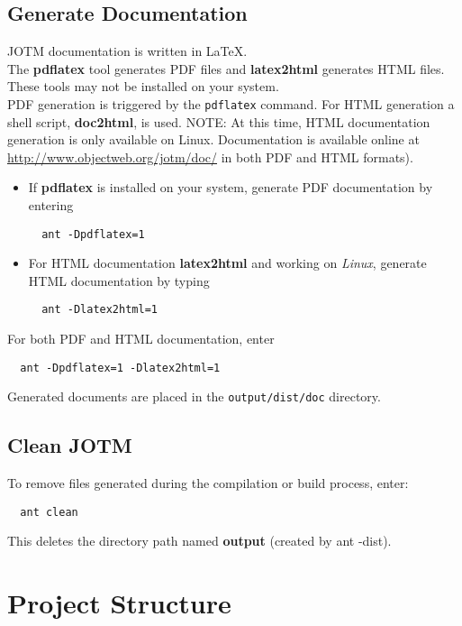 \documentclass[a4paper,11pt]{article}
\begin{document}
\subsection{Generate Documentation}
\label{sec:doc_cmd}
JOTM documentation is written in LaTeX.\\
The \textbf{pdflatex} tool generates PDF files and
\textbf{latex2html} generates HTML files. These tools may
not be installed on your system.\\
PDF generation is triggered by the \texttt{pdflatex}
command. For HTML generation a shell
script, \textbf{doc2html}, is used. NOTE: At this time, HTML documentation
generation is only available on Linux. Documentation is 
available online at \url{http://www.objectweb.org/jotm/doc/} in
both PDF and HTML formats).
\begin{itemize}
\item If \textbf{pdflatex} is installed on your system, 
generate PDF documentation by entering
\begin{verbatim}
  ant -Dpdflatex=1
\end{verbatim}
\item For HTML documentation \textbf{latex2html} and working on \emph{Linux}, 
generate HTML documentation by typing
\begin{verbatim}
  ant -Dlatex2html=1
\end{verbatim}
\end{itemize}

\noindent For both PDF and HTML documentation, enter
\begin{verbatim}
  ant -Dpdflatex=1 -Dlatex2html=1
\end{verbatim}

\noindent Generated documents are placed in the \texttt{output/dist/doc} directory.

\subsection{Clean JOTM}
\label{sec:clean_cmd}

To remove files generated during the compilation or build process, enter:
\begin{verbatim}
  ant clean
\end{verbatim}
This deletes the directory path named \textbf{output} (created by ant -dist).

\section{Project Structure}
\label{sec:proj_desc}
\end{document}
